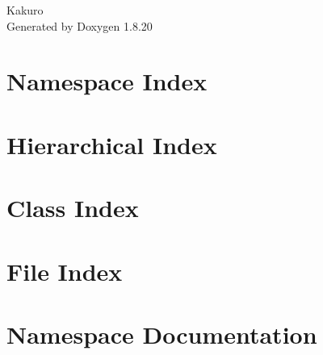 \let\mypdfximage\pdfximage\def\pdfximage{\immediate\mypdfximage}\documentclass[twoside]{book}
\newcommand{\+}{\discretionary{\mbox{\scriptsize$\hookleftarrow$}}{}{}}
\newcommand{\clearemptydoublepage}{%
  \newpage{\pagestyle{empty}\cleardoublepage}%
}
\begin{document}
\hypersetup{pageanchor=false,
             bookmarksnumbered=true,
             pdfencoding=unicode
            }
\begin{titlepage}
\vspace*{7cm}
\begin{center}%
{\Large Kakuro }\\
\vspace*{1cm}
{\large Generated by Doxygen 1.8.20}\\
\end{center}
\end{titlepage}
\clearemptydoublepage
{}
\tableofcontents
\clearemptydoublepage
{}
\hypersetup{pageanchor=true}

\chapter{Namespace Index}

\chapter{Hierarchical Index}

\chapter{Class Index}

\chapter{File Index}

\chapter{Namespace Documentation}








\end{document}
